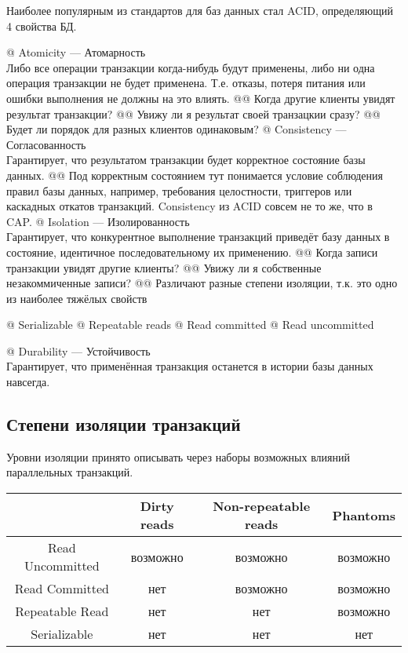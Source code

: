 Наиболее популярным из стандартов для баз данных стал ACID, определяющий 4 свойства БД.

\begin{el}[ul]
@ Atomicity --- Атомарность\\
Либо все операции транзакции когда-нибудь будут применены, либо ни одна операция транзакции не будет применена. Т.е. отказы, потеря питания или ошибки выполнения не должны на это влиять.
@@ Когда другие клиенты увидят результат транзакции?
@@ Увижу ли я результат своей транзацкии сразу?
@@ Будет ли порядок для разных клиентов одинаковым?
@ Consistency --- Согласованность\\
Гарантирует, что результатом транзакции будет корректное состояние базы данных.
@@ Под корректным состоянием тут понимается условие соблюдения правил базы данных, например, требования целостности, триггеров или каскадных откатов транзакций.
Consistency из ACID совсем не то же, что в CAP.
@ Isolation --- Изолированность\\
Гарантирует, что конкурентное выполнение транзакций приведёт базу данных в состояние, идентичное последовательному их применению.
@@ Когда записи транзакции увидят другие клиенты?
@@ Увижу ли я собственные незакоммиченные записи?
@@ Различают разные степени изоляции, т.к. это одно из наиболее тяжёлых свойств
\begin{el}[ol]
@ Serializable
@ Repeatable reads
@ Read committed
@ Read uncommitted
\end{el}
@ Durability --- Устойчивость\\
Гарантирует, что применённая транзакция останется в истории базы данных навсегда.
\end{el}

\subsection{Степени изоляции транзакций}
Уровни изоляции принято описывать через наборы возможных влияний параллельных транзакций.

\begin{tabular}{|c|c|c|c|}
\hline
& Dirty reads & Non-repeatable reads & Phantoms\\
\hline
\hline
Read Uncommitted& {\cellcolor{red}} возможно& {\cellcolor{red}} возможно    & {\cellcolor{red}} возможно \\
\hline
Read Committed  & {\cellcolor{green}} нет & {\cellcolor{red}} возможно    & {\cellcolor{red}} возможно \\
\hline
Repeatable Read & {\cellcolor{green}} нет & {\cellcolor{green}} нет	& {\cellcolor{red}} возможно \\
\hline
Serializable    & {\cellcolor{green}} нет & {\cellcolor{green}} нет & {\cellcolor{green}} нет \\
\hline
\end{tabular}

